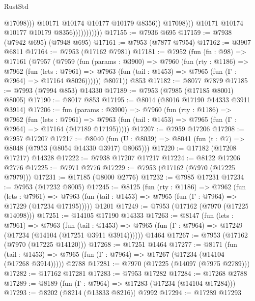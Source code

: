 \begin{lexlean}{RustStd}
\begin{coremodule}
                                          @17098)))
                                    @10171
                                    @10174
                                    @10177
                                    @10179
                                    @8356))
                                @17098)))
                          @10171
                          @10174
                          @10177
                          @10179
                          @8356)))))))))))
@17155 := @7936 @695
@17159 := @7938 (@7942 @695) (@7948 @695)
@17161 := @7953 (@7877 @7954)
@17162 := @3907 @6811
@17164 := @7953 (@17162 @7981)
@17181 := @7952
    (fun (fn : @98) =>
    @17161
      (@7957
        (@7959
          (fun (params : @3900) =>
          @7960
            (fun (rty : @1186) =>
            @7962
              (fun (lets : @7961) =>
              @7963 (fun (tail : @1453) => @7965 (fun (Γ : @7964) => @17164 @8026))))))
        @8071))
    @853
@17182 := @8077 @7879
@17185 := @7993 (@7994 @853) @14330
@17189 := @7953 (@7985 (@17185 @8001) @8005)
@17190 := @8017 @853
@17195 := @8014 (@8016 @17190 @14333 @3911 @3914)
@17206 := fun (params : @3900) =>
  @7960
    (fun (rty : @1186) =>
    @7962
      (fun (lets : @7961) =>
      @7963 (fun (tail : @1453) => @7965 (fun (Γ : @7964) => @17164 (@17189 @17195)))))
@17207 := @7959 @17206
@17208 := @7957 @17207
@17217 := @8040
    (fun (U : @8039) => @8041 (fun (t : @7) => @8048 (@7953 (@8054 @14330 @3917) @8065)))
@17220 := @17182 (@17208 @17217) @14328
@17222 := @7938 @17207 @17217
@17224 := @8122 @17206 @2776
@17225 := @7971 @2776
@17229 := @7953 (@17162 (@7970 (@17225 @7979)))
@17231 := @17185 (@8000 @2776)
@17232 := @7985 @17231
@17234 := @7953 (@17232 @8005)
@17245 := @8125
    (fun (rty : @1186) =>
    @7962
      (fun (lets : @7961) =>
      @7963 (fun (tail : @1453) => @7965 (fun (Γ : @7964) => @17229 (@17234 @17195)))))
    @1201
@17249 := @7953 (@17162 (@7970 (@17225 @14098)))
@17251 := @14105 @17190 @14333
@17263 := @8147
    (fun (lets : @7961) =>
    @7963
      (fun (tail : @1453) =>
      @7965 (fun (Γ : @7964) => @17249 (@17234 (@14104 (@17251 @3911 @3914))))))
    @1464
@17267 := @7953 (@17162 (@7970 (@17225 @14120)))
@17268 := @17251 @1464
@17277 := @8171
    (fun (tail : @1453) => @7965 (fun (Γ : @7964) => @17267 (@17234 (@14104 (@17268 @3914)))))
    @2788
@17281 := @7970 (@17225 (@14097 (@7975 @2789)))
@17282 := @17162 @17281
@17283 := @7953 @17282
@17284 := @17268 @2788
@17289 := @8189 (fun (Γ : @7964) => @17283 (@17234 (@14104 @17284)))
@17293 := @8202 (@8214 (@13833 @8216)) @7992
@17294 := @17289 @17293

\end{coremodule}
\end{lexlean}
